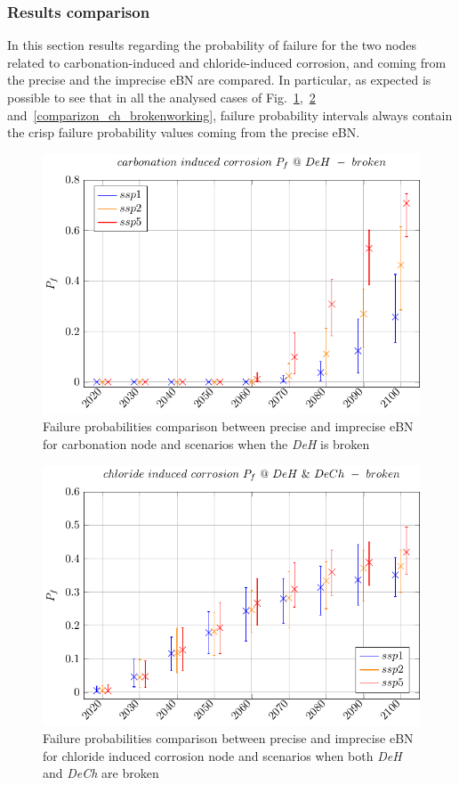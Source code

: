 \subsubsection{Results comparison}
In this section results regarding the probability of failure for the two nodes related to carbonation-induced and chloride-induced corrosion, and coming from the precise and the imprecise eBN are compared. 
In particular, as expected is possible to see that in all the analysed cases of Fig.~\ref{comparizon_carb},~\ref{comparizon_ch_brokenbroken} and~\ref{comparizon_ch_brokenworking}, failure probability intervals always contain the crisp failure probability values coming from the precise eBN.
\begin{figure}[H]
    \centering
    \includegraphics[width=0.8\linewidth]{imgs/pdfs/22_carbonation_comparizon_broken.pdf}
    \caption{Failure probabilities comparison between precise and imprecise eBN for carbonation node and scenarios when the \textit{DeH} is broken}\label{comparizon_carb}
\end{figure}

\begin{figure}[H]
    \centering
    \includegraphics[width=0.8\linewidth]{imgs/pdfs/20_Chloride_comparizon_brokenbroken.pdf}
    \caption{Failure probabilities comparison between precise and imprecise eBN for chloride induced corrosion node and scenarios when both \textit{DeH} and \textit{DeCh} are broken}\label{comparizon_ch_brokenbroken}
\end{figure}

